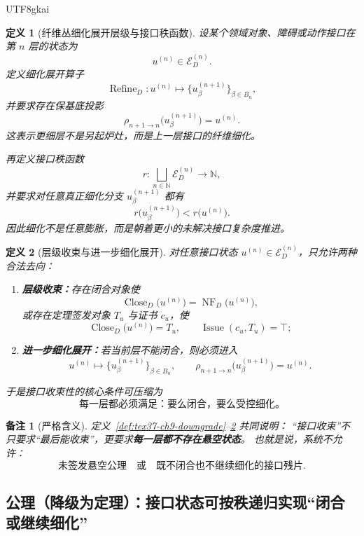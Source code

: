 \documentclass[12pt]{article}
\newtheorem{definition}{定义}[section]
\newtheorem{remark}{备注}[section]
\newcommand{\NN}{\mathbb{N}}
\newcommand{\Refine}{\operatorname{Refine}}
\newcommand{\Close}{\operatorname{Close}}
\newcommand{\Issue}{\operatorname{Issue}}
\begin{document}
\begin{CJK*}{UTF8}{gkai}
\begin{definition}[纤维丛细化展开层级与接口秩函数]
\label{def:tex37-ch9-refine}
设某个领域对象、障碍或动作接口在第 $n$ 层的状态为
\[
  u^{(n)}\in \mathcal E_D^{(n)}.
\]
定义细化展开算子
\[
  \Refine_D:
  u^{(n)}
  \longmapsto
  \bigl\{u_\beta^{(n+1)}\bigr\}_{\beta\in B_n},
\]
并要求存在保基底投影
\[
  \rho_{n+1\to n}\bigl(u_\beta^{(n+1)}\bigr)=u^{(n)}.
\]
这表示更细层不是另起炉灶，而是上一层接口的纤维细化。

再定义接口秩函数
\[
  r:
  \bigsqcup_{n\in\NN}\mathcal E_D^{(n)}
  \to
  \NN,
\]
并要求对任意真正细化分支 $u_\beta^{(n+1)}$ 都有
\[
  r\bigl(u_\beta^{(n+1)}\bigr)<r\bigl(u^{(n)}\bigr).
\]
因此细化不是任意膨胀，而是朝着更小的未解决接口复杂度推进。
\end{definition}

\begin{definition}[层级收束与进一步细化展开]
\label{def:tex37-ch9-close-or-refine}
对任意接口状态 $u^{(n)}\in \mathcal E_D^{(n)}$，只允许两种合法去向：
\begin{enumerate}
  \item \textbf{层级收束：}存在闭合对象使
  \[
    \Close_D\bigl(u^{(n)}\bigr)=\operatorname{NF}_D\bigl(u^{(n)}\bigr),
  \]
  或存在定理签发对象 $T_u$ 与证书 $c_u$，使
  \[
    \Close_D\bigl(u^{(n)}\bigr)=T_u,
    \qquad
    \Issue(c_u,T_u)=\top;
  \]
  \item \textbf{进一步细化展开：}若当前层不能闭合，则必须进入
  \[
    u^{(n)}
    \longmapsto
    \bigl\{u_\beta^{(n+1)}\bigr\}_{\beta\in B_n},
    \qquad
    \rho_{n+1\to n}\bigl(u_\beta^{(n+1)}\bigr)=u^{(n)}.
  \]
\end{enumerate}
于是接口收束性的核心条件可压缩为
\[
  \boxed{
    \text{每一层都必须满足：要么闭合，要么受控细化。}
  }
\]
\end{definition}

\begin{remark}[严格含义]
定义~\ref{def:tex37-ch9-downgrade}--\ref{def:tex37-ch9-close-or-refine} 共同说明：
“接口收束”不只要求“最后能收束”，更要求\textbf{每一层都不存在悬空状态}。
也就是说，系统不允许：
\[
  \text{未签发悬空公理}
  \quad\text{或}\quad
  \text{既不闭合也不继续细化的接口残片}.
\]
\end{remark}

\subsection{公理（降级为定理）：接口状态可按秩递归实现“闭合或继续细化”}
\label{subsec:tex37-ch9-axiom}


\end{CJK*}
\end{document}
